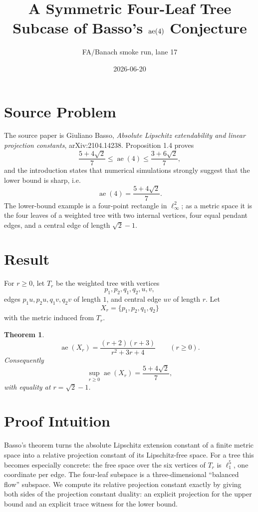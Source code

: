 \documentclass[11pt]{article}
\title{A Symmetric Four-Leaf Tree Subcase of Basso's \(\aext(4)\) Conjecture}
\author{FA/Banach smoke run, lane 17}
\date{2026-06-20}
\newtheorem{theorem}{Theorem}
\newcommand{\aext}{\operatorname{ae}}
\begin{document}
\maketitle

\section*{Source Problem}

The source paper is Giuliano Basso, \emph{Absolute Lipschitz extendability and
linear projection constants}, arXiv:2104.14238.  Proposition 1.4 proves
\[
   \frac{5+4\sqrt2}{7}\leq \aext(4)\leq \frac{3+6\sqrt2}{7},
\]
and the introduction states that numerical simulations strongly suggest that
the lower bound is sharp, i.e.
\[
   \aext(4)=\frac{5+4\sqrt2}{7}.
\]
The lower-bound example is a four-point rectangle in \(\ell_\infty^2\); as a
metric space it is the four leaves of a weighted tree with two internal
vertices, four equal pendant edges, and a central edge of length \(\sqrt2-1\).

\section*{Result}

For \(r\geq 0\), let \(T_r\) be the weighted tree with vertices
\[
  p_1,p_2,q_1,q_2,u,v,
\]
edges \(p_1u,p_2u,q_1v,q_2v\) of length \(1\), and central edge \(uv\) of
length \(r\).  Let
\[
  X_r=\{p_1,p_2,q_1,q_2\}
\]
with the metric induced from \(T_r\).

\begin{theorem}
\[
   \aext(X_r)=\frac{(r+2)(r+3)}{r^2+3r+4}\qquad (r\geq 0).
\]
Consequently
\[
   \sup_{r\geq0}\aext(X_r)=\frac{5+4\sqrt2}{7},
\]
with equality at \(r=\sqrt2-1\).
\end{theorem}

\section*{Proof Intuition}

Basso's theorem turns the absolute Lipschitz extension constant of a finite
metric space into a relative projection constant of its Lipschitz-free space.
For a tree this becomes especially concrete: the free space over the six
vertices of \(T_r\) is \(\ell_1^5\), one coordinate per edge.  The four-leaf
subspace is a three-dimensional ``balanced flow'' subspace.  We compute its
relative projection constant exactly by giving both sides of the projection
constant duality: an explicit projection for the upper bound and an explicit
trace witness for the lower bound.
\end{document}

